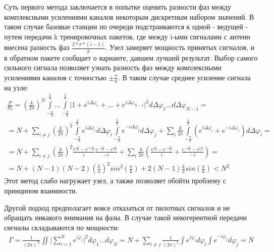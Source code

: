 \documentclass[a4paper,12pt,oneside]{scrartcl}
\begin{document}
Суть первого метода заключается в попытке оценить разности фаз между комплексными усилениями каналов некоторым дискретным набором значений. 
В таком случае базовые станции по очереди подстраиваются к одной - ведущей - путем передачи k тренировочных пакетов, где между i-ыми сигналами с антенн внесена разность фаз $\frac{2*\pi*(i-1)}{k}$. 
Узел замеряет мощность принятых сигналов, и в обратном пакете сообщает о варианте, давшем лучший результат. 
Выбор самого сильного сигнала позволяет узнать разность фаз между комплексными усилениями каналов с точностью $\pm\frac{\pi}{k}$. 
В таком случае среднее усиление сигнала на узле:
\begin{gather}
\frac{P}{P_0} = \left(\frac{k}{2\pi}\right)^N\int\limits_{-\frac{\pi}{k}}^{\frac{\pi}{k}}\ldots\int\limits_{-\frac{\pi}{k}}^{\frac{\pi}{k}}\bigl|1+e^{i\Delta\varphi_1}+\ldots+e^{i\Delta\varphi_{N-1}}\bigr|^2d\Delta\varphi_1\ldots d\Delta\varphi_{N-1} = \nonumber \\
= N + \sum\limits_{i\neq j}\left(\frac{k}{2\pi}\right)^2\int\limits_{-\frac{\pi}{k}}^{\frac{\pi}{k}} e^{i\Delta\varphi_i} d\Delta\varphi_i \int\limits_{-\frac{\pi}{k}}^{\frac{\pi}{k}} e^{-i\Delta\varphi_j}d\Delta\varphi_j + \sum\limits_{i}\frac{k}{2\pi}\int\limits_{-\frac{\pi}{k}}^{\frac{\pi}{k}} \left( e^{i\Delta\varphi_i} + e^{-i\Delta\varphi_i}\right)d\Delta\varphi_i = \nonumber \\
= N +  \sum\limits_{i\neq j}\left(\frac{k}{2\pi}\right)^2\frac{e^{i\frac{\pi}{k}}-e^{-i\frac{\pi}{k}}}{i}\frac{e^{-i\frac{\pi}{k}}-e^{i\frac{\pi}{k}}}{-i}+\sum\limits_{i}\frac{k}{2\pi}\left(\frac{e^{i\frac{\pi}{k}}-e^{-i\frac{\pi}{k}}}{i}+\frac{e^{-i\frac{\pi}{k}}-e^{i\frac{\pi}{k}}}{-i}\right) = \nonumber \\
= N + \left(N-1\right)\left(N-2\right)\left(\frac{k}{\pi}\right)^2sin^2\left(\frac{\pi}{k}\right)+2\left(N-1\right)\frac{k}{\pi}sin\left(\frac{\pi}{k}\right) < N^2
\end{gather}
Этот метод слабо нагружает узел, а также позволяет обойти проблему с принципом взаимности. 

Другой подход предполагает вовсе отказаться от пилотных сигналов и не обращать никакого внимания на фазы. В случае такой некогерентной передачи сигналы складываются по мощности:
\begin{gather}
\Gamma = \frac{1}{\left(2\pi\right)^N}\iint\bigl|\sum\limits_{i=1}^Ne^{i\varphi_i}\bigr|^2d\varphi_1\ldots d\varphi_N = N + \sum\limits_{i\neq j}\frac{1}{\left(2\pi\right)^2}\int e^{i\varphi_i} d\varphi_i \int\limits e^{-i\varphi_j}d\varphi_j = N
\end{gather}
\end{document}
